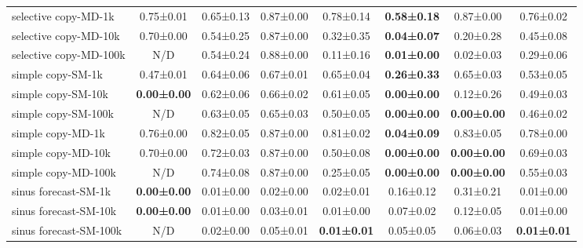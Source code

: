\documentclass{article}
\begin{document}
\begin{table}[H]
{\begin{tabular}{lccccccc}
selective copy-MD-1k                   & 0.75±0.01      & 0.65±0.13      & 0.87±0.00      & 0.78±0.14      & \textbf{0.58±0.18}        & 0.87±0.00           & 0.76±0.02      \\
selective copy-MD-10k                  & 0.70±0.00      & 0.54±0.25      & 0.87±0.00      & 0.32±0.35      & \textbf{0.04±0.07}        & 0.20±0.28           & 0.45±0.08      \\
selective copy-MD-100k                 & N/D              & 0.54±0.24      & 0.88±0.00      & 0.11±0.16      & \textbf{0.01±0.00}        & 0.02±0.03           & 0.29±0.06      \\
simple copy-SM-1k                      & 0.47±0.01      & 0.64±0.06      & 0.67±0.01      & 0.65±0.04      & \textbf{0.26±0.33}        & 0.65±0.03           & 0.53±0.05      \\
simple copy-SM-10k                     & \textbf{0.00±0.00}  & 0.62±0.06      & 0.66±0.02      & 0.61±0.05      & \textbf{0.00±0.00}        & 0.12±0.26           & 0.49±0.03      \\
simple copy-SM-100k                    & N/D              & 0.63±0.05      & 0.65±0.03      & 0.50±0.05      & \textbf{0.00±0.00}        & \textbf{0.00±0.00}       & 0.46±0.02      \\
simple copy-MD-1k                      & 0.76±0.00      & 0.82±0.05      & 0.87±0.00      & 0.81±0.02      & \textbf{0.04±0.09}        & 0.83±0.05           & 0.78±0.00      \\
simple copy-MD-10k                     & 0.70±0.00      & 0.72±0.03      & 0.87±0.00      & 0.50±0.08      & \textbf{0.00±0.00}        & \textbf{0.00±0.00}       & 0.69±0.03      \\
simple copy-MD-100k                    & N/D              & 0.74±0.08      & 0.87±0.00      & 0.25±0.05      & \textbf{0.00±0.00}        & \textbf{0.00±0.00}       & 0.55±0.03      \\
sinus forecast-SM-1k                & \textbf{0.00±0.00}  & 0.01±0.00      & 0.02±0.00      & 0.02±0.01      & 0.16±0.12            & 0.31±0.21           & 0.01±0.00      \\
sinus forecast-SM-10k               & \textbf{0.00±0.00}  & 0.01±0.00      & 0.03±0.01      & 0.01±0.00      & 0.07±0.02            & 0.12±0.05           & 0.01±0.00      \\
sinus forecast-SM-100k              & N/D              & 0.02±0.00      & 0.05±0.01      & \textbf{0.01±0.01}  & 0.05±0.05            & 0.06±0.03           & \textbf{0.01±0.01}  \\

\end{tabular}}
\end{table}
\end{document}
